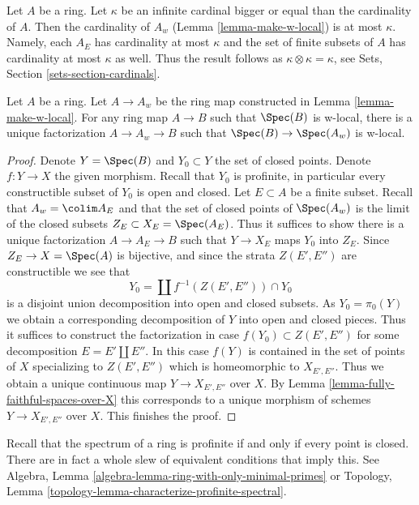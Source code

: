 \begin{remark}
\label{remark-size-w}
Let $A$ be a ring. Let $\kappa$ be an infinite cardinal bigger or
equal than the cardinality of $A$. Then the cardinality of $A_w$
(Lemma \ref{lemma-make-w-local})
is at most $\kappa$. Namely, each $A_E$ has cardinality at most
$\kappa$ and the set of finite subsets of $A$ has cardinality at most $\kappa$
as well. Thus the result follows as $\kappa \otimes \kappa = \kappa$, see
Sets, Section \ref{sets-section-cardinals}.
\end{remark}

\begin{lemma}
\label{lemma-universal}
Let $A$ be a ring. Let $A \to A_w$ be the ring map constructed in
Lemma \ref{lemma-make-w-local}. For any ring map $A \to B$ such that
$\Spec(B)$ is w-local, there is a unique factorization $A \to A_w \to B$
such that $\Spec(B) \to \Spec(A_w)$ is w-local.
\end{lemma}

\begin{proof}
Denote $Y = \Spec(B)$ and $Y_0 \subset Y$ the set of closed points.
Denote $f : Y \to X$ the given morphism.
Recall that $Y_0$ is profinite, in particular every constructible
subset of $Y_0$ is open and closed. Let $E \subset A$ be a finite subset.
Recall that $A_w = \colim A_E$ and that the set of closed points of
$\Spec(A_w)$ is the limit of the closed subsets $Z_E \subset X_E = \Spec(A_E)$.
Thus it suffices to show there is a unique factorization $A \to A_E \to B$
such that $Y \to X_E$ maps $Y_0$ into $Z_E$.
Since $Z_E \to X = \Spec(A)$ is bijective, and since the strata
$Z(E', E'')$ are constructible we see that
$$
Y_0 = \coprod f^{-1}(Z(E', E'')) \cap Y_0
$$
is a disjoint union decomposition into open and closed subsets.
As $Y_0 = \pi_0(Y)$ we obtain a corresponding decomposition of
$Y$ into open and closed pieces. Thus it suffices to construct
the factorization in case $f(Y_0) \subset Z(E', E'')$ for
some decomposition $E = E' \amalg E''$.
In this case $f(Y)$ is contained in the set of points of $X$
specializing to $Z(E', E'')$ which is homeomorphic to $X_{E', E''}$.
Thus we obtain a unique continuous map $Y \to X_{E', E''}$ over $X$. By
Lemma \ref{lemma-fully-faithful-spaces-over-X}
this corresponds to a unique morphism of schemes
$Y \to X_{E', E''}$ over $X$. This finishes the proof.
\end{proof}

\noindent
Recall that the spectrum of a ring is profinite if and only if
every point is closed. There are in fact a whole slew of equivalent
conditions that imply this. See
Algebra, Lemma \ref{algebra-lemma-ring-with-only-minimal-primes} or
Topology, Lemma \ref{topology-lemma-characterize-profinite-spectral}.

